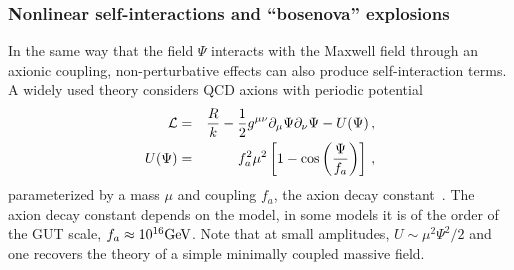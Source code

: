 \documentclass[11pt]{article}
\def\beq{\begin{eqnarray}}
\def\eeq{\end{eqnarray}}
\numberwithin{equation}{section} %
\begin{document}
\subsubsection{Nonlinear self-interactions and ``bosenova'' explosions}\label{sec:bosenova}


In the same way that the field $\Psi$ interacts with the Maxwell field through an axionic coupling, non-perturbative 
effects can also produce self-interaction terms. A widely used theory considers QCD axions with periodic potential
%
\beq
\label{eq:MFaction_bosenova}
{\cal L}&=&\frac{R}{k}- \frac{1}{2} g^{\mu\nu} \partial_{\mu}\Psi\partial_{\nu} \Psi-U(\Psi) \,,\\
%
U(\Psi)&=& f_a^2 \mu^2\left[1-\cos\left(\frac{\Psi}{f_a}\right)\right] \,, \label{axion_pot}
\eeq
%
parameterized by a mass $\mu$ and coupling $f_a$, the axion decay 
constant~\cite{Kodama:2011zc,Yoshino:2012kn,Marsh:2015xka}. 
The axion decay constant depends on the model, in some models it is of the order of the GUT scale, $f_a\approx 
10^{16}{\rm GeV}$.
Note that at small amplitudes, $U\sim \mu^2\Psi^2/2$ and one recovers the theory of a simple minimally coupled massive 
field.
\end{document}
